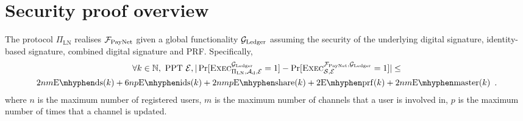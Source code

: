 \section{Security proof overview}
\label{sec:ov-security-proof}
  \begin{theorem}
The protocol $\Pi_{\mathrm{LN}}$ realises $\mathcal{F}_{\mathrm{PayNet}}$
given a global functionality $\mathcal{G}_{\mathrm{Ledger}}$
assuming the security of the underlying digital signature, identity-based signature, 
combined digital signature and PRF. Specifically, 
    \label{theorem:simulation}
    \begin{gather*}
      \forall k \in \mathbb{N}, \text{ PPT } \environment, 
      |\Pr[\textsc{Exec}^{\ledger}_{\Pi_{\mathrm{LN}}, \adversary_{\mathrm{d}},
      \environment} = 1] - \Pr[\textsc{Exec}^{\fpaynet, \ledger}_{\simulator,
      \environment} = 1]| \leq \\
      2nm  \mathrm{E \mhyphen ds}(k)  + 6np  \mathrm{E \mhyphen ids}(k) +
      2nmp  \mathrm{E \mhyphen share}(k) + 2 \mathrm{E \mhyphen
      prf}(k) + 2nm \mathrm{E \mhyphen master}(k) \enspace.
    \end{gather*}
    where $n$ is the maximum number of registered users, 
    $m$ is the maximum number of channels that a user is involved in,
    $p$ is the maximum number of times that a channel is updated. 
  \end{theorem}

